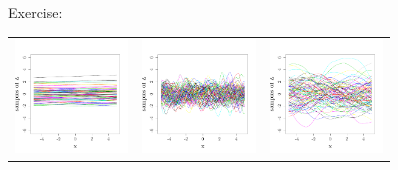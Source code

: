\begin{frame}{}
\begin{exampleblock}{Exercise: }
\begin{center}
\begin{tabular}{ccc}
\includegraphics[height=3cm]{1_stat_models/figures/R/MVN_traj150} &\includegraphics[height=3cm]{1_stat_models/figures/R/MVN_traj105}& \includegraphics[height=3cm]{1_stat_models/figures/R/MVN_traj33}
\end{tabular}
\end{center}
\end{exampleblock}
\end{frame}

